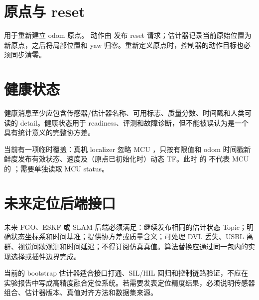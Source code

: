 \section{原点与 reset}
 用于重新建立 odom 原点。 动作由  发布 reset 请求；估计器记录当前原始位置为新原点，之后将局部位置和 yaw 归零。重新定义原点时，控制器的动作目标也必须同步清零。

\section{健康状态}
健康消息至少应包含传感器/估计器名称、可用标志、质量分数、时间戳和人类可读的 detail。健康状态用于 readiness、评测和故障诊断，但不能被误认为是一个具有统计意义的完整协方差。

当前有一项临时覆盖：真机 localizer 忽略 MCU ，只按有限值和 odom 时间戳新鲜度发布有效状态、速度及（原点已初始化时）动态 TF。此时  的  不代表 MCU 的 ；需要单独读取 MCU status。

\section{未来定位后端接口}
未来 FGO、ESKF 或 SLAM 后端必须满足：继续发布相同的估计状态 Topic；明确状态坐标系和时间基准；提供协方差或质量含义；可处理 DVL 丢失、USBL 离群、视觉间歇观测和时间延迟；不得订阅仿真真值。算法替换应通过同一包内的实现选择或插件边界完成。

\begin{warningbox}
当前的 bootstrap 估计器适合接口打通、SIL/HIL 回归和控制链路验证，不应在实验报告中写成高精度融合定位系统。若需要发表定位精度结果，必须说明传感器组合、估计器版本、真值对齐方法和数据集来源。
\end{warningbox}
